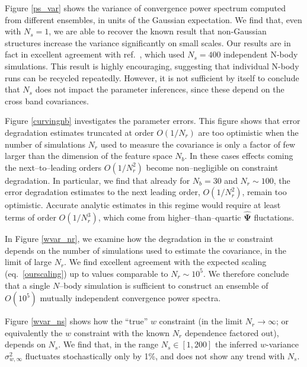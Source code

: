 \documentclass[reprint,aps,prd,superscriptaddress,showkeys,showpacs]{revtex4-1}
\newcommand{\bbh}[1]{\mathbf{\hat{#1}}}
\begin{document}
Figure \ref{ps_var} shows the variance of convergence power spectrum
computed from different ensembles, in units of the Gaussian
expectation. We find that, even with $N_s=1$, we are able to recover
the known result that non-Gaussian structures increase the variance
significantly on small scales. 
Our results are in fact in excellent agreement with
ref.~\citep{Sato12}, which used $N_s=400$ independent N-body
simulations.  This result is highly encouraging, suggesting that
individual N-body runs can be recycled repeatedly.  However, it is not
sufficient by itself to conclude that $N_s$ does not impact the
parameter inferences, since these depend on the cross band
covariances.

Figure \ref{curvingnb} investigates the parameter errors. This figure
shows that error degradation estimates truncated at order $O(1/N_r)$
are too optimistic when the number of simulations $N_r$ used to
measure the covariance is only a factor of few larger than the
dimension of the feature space $N_b$. In these cases effects coming
the next--to--leading orders $O(1/N_r^2)$ become non--negligible on
constraint degradation. In particular, we find that already for
$N_b=30$ and $N_r\sim100$, the error degradation estimates to the next
leading order, $O(1/N_r^2)$, remain too optimistic. Accurate analytic
estimates in this regime would require at least terms of order
$O(1/N_r^3)$, which come from higher--than--quartic $\bbh{\Psi}$
fluctations.

In Figure \ref{wvar_nr}, we examine how the degradation in the $w$
constraint depends on the number of simulations used to estimate the
covariance, in the limit of large $N_r$. We find excellent agreement
with the expected scaling (eq.~\ref{ourscaling}) up to values
comparable to $N_r\sim 10^5$. We therefore conclude that a single
$N$--body simulation is sufficient to construct an ensemble of
$O(10^5)$ mutually independent convergence power spectra.

Figure \ref{wvar_ns} shows how the ``true'' $w$ constraint (in the
limit $N_r\rightarrow \infty$; or equivalently the $w$ constraint with
the known $N_r$ dependence factored out),
depends on $N_s$. We find that, in the range $N_s\in[1,200]$ the
inferred $w$-variance $\sigma_{w,\infty}^2$ fluctuates stochastically
only by 1\%, and does not show any trend with $N_s$.
\end{document}
